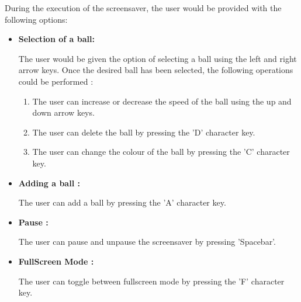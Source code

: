 \documentclass[]{article}
\begin{document}
\begin{flushleft} 

During the execution of the screensaver, the user would be provided with the following options:

\begin{itemize}

\item \textbf{Selection of a ball:}

The user would be given the option of selecting a ball using the left and right arrow keys. Once the desired ball has been selected, the following operations could be performed :

\begin{enumerate}


\item The user can increase or decrease the speed of the ball using the up and down arrow keys. 


\item The user can delete the ball by pressing the 'D' character key. 


\item The user can change the colour of the ball by pressing the 'C' character key.

\end{enumerate}


\item \textbf{Adding a ball :}

The user can add a ball by pressing the 'A' character key.


\item\textbf{Pause :}

The user can pause and unpause the screensaver by pressing 'Spacebar'.


\item \textbf{FullScreen Mode :}

The user can toggle between fullscreen mode by pressing the 'F' character key.


\end{itemize}

\end{flushleft}
\end{document}

